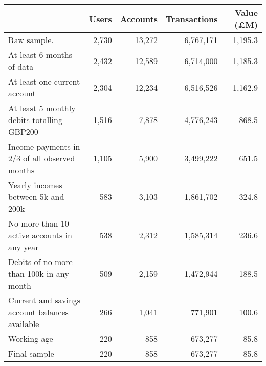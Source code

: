 \begin{tabular}{lrrrr}
\toprule
                                               & Users & Accounts & Transactions & Value (\pounds M) \\
\midrule
                                   Raw sample. & 2,730 &   13,272 &    6,767,171 &           1,195.3 \\
                     At least 6 months of data & 2,432 &   12,589 &    6,714,000 &           1,185.3 \\
                  At least one current account & 2,304 &   12,234 &    6,516,526 &           1,162.9 \\
    At least 5 monthly debits totalling GBP200 & 1,516 &    7,878 &    4,776,243 &             868.5 \\
 Income payments in 2/3 of all observed months & 1,105 &    5,900 &    3,499,222 &             651.5 \\
            Yearly incomes between 5k and 200k &   583 &    3,103 &    1,861,702 &             324.8 \\
   No more than 10 active accounts in any year &   538 &    2,312 &    1,585,314 &             236.6 \\
      Debits of no more than 100k in any month &   509 &    2,159 &    1,472,944 &             188.5 \\
Current and savings account balances available &   266 &    1,041 &      771,901 &             100.6 \\
                                   Working-age &   220 &      858 &      673,277 &              85.8 \\
                                  Final sample &   220 &      858 &      673,277 &              85.8 \\
\bottomrule
\end{tabular}
